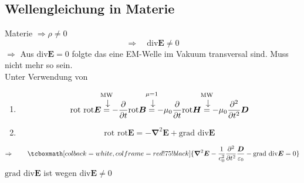 \documentclass[titlepage,11pt,a4paper,ngerman]{report}
\newcommand{\tx}[1]{\textrm{#1}}
\newcommand{\custoup}[3]{\overset{\scriptstyle\underset{\mkern4mu\rotatebox{-90}{$\hspace{-3pt} #1$}}{#3}}{#2}}
\newcommand{\prt}[2]{\frac{\partial #1}{\partial #2}}
\renewcommand{\vec}[1]{\boldsymbol{#1}}
\renewcommand{\epsilon}{\varepsilon}
\newcommand{\vabla}{\boldsymbol{\nabla}}
\newcommand{\rmbox}[1]{\tcboxmath[colback=white,colframe=red!75!black]{#1}}
\begin{document}
\subsection{Wellengleichung in Materie}

Materie $ \Rightarrow \rho \neq 0 $
\begin{equation*}
\Rightarrow \quad \tx{div} \vec{E} \neq 0
\end{equation*}
$ \Rightarrow $ Aus $ \tx{div} \vec{E} = 0 $ folgte das eine EM-Welle im Vakuum transversal sind. Muss nicht mehr so sein.\\[5pt]
Unter Verwendung von
\begin{enumerate}[(1)]
	\item \begin{equation*}
	\tx{rot rot} \vec{E} \custoup{\rightarrow}{=}{\mathclap{\tx{MW}}} - \prt{}{t} \tx{rot} \vec{B} \custoup{\rightarrow}{=}{\mathclap{\mu = 1}} - \mu_0 \prt{}{t} \tx{rot} \vec{H} \custoup{\rightarrow}{=}{\mathclap{\tx{MW}}} - \mu_0 \prt{^2}{t^2} \vec{D}
	\end{equation*}
	\item \begin{equation*}
	\tx{rot rot} \vec{E} = - \vabla^2 \vec{E} + \tx{grad div} \vec{E}
	\end{equation*}
\end{enumerate}


\begin{equation*}
\Rightarrow \qquad \rmbox{\vabla^2 \vec{E} - \frac{1}{c_0^2} \prt{^2}{t^2} \frac{\vec{D}}{\epsilon_0} - \tx{grad div} \vec{E} = 0}
\end{equation*}
\color{black!20!red} $ \tx{grad div} \vec{E} $ ist wegen $ \tx{div} \vec{E} \neq 0 $ \color{black}
\end{document}
